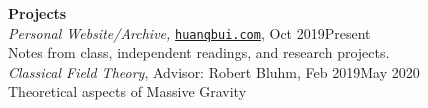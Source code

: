 \documentclass[10pt]{article}
\begin{document}



\noindent \large{\textbf{{Projects}}}	\normalsize  \\ 
\noindent \textit{Personal Website/Archive,}
\href{https://huanqbui.com}{\texttt{huanqbui.com}}, {Oct 2019\textendash Present} \\
\noindent Notes from class, independent readings, and research projects.\\

\noindent \textit{Classical Field Theory}, Advisor: Robert Bluhm, {Feb 2019\textendash May 2020}\\
\noindent Theoretical aspects of Massive Gravity\\





%
%
%












\end{document}
